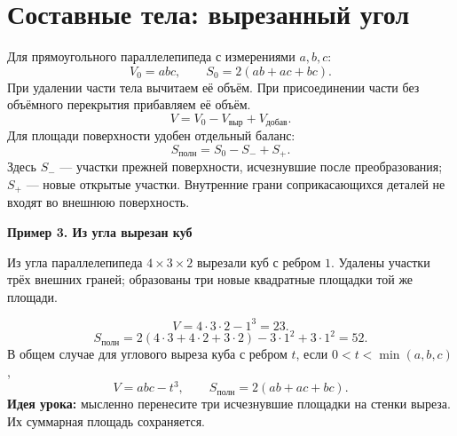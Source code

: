 \documentclass[a4paper,12pt]{article}
\newcommand{\sub}[1]{\par\medskip\textcolor{darkaccent}{\textbf{#1}}\par\smallskip}
\newcommand{\Sp}{S_{\text{полн}}}
\begin{document}
\section{Составные тела: вырезанный угол}
Для прямоугольного параллелепипеда с измерениями $a,b,c$:
\[
V_0=abc,\qquad S_0=2(ab+ac+bc).
\]
При удалении части тела вычитаем её объём. При присоединении части без объёмного перекрытия прибавляем её объём.
\[
V=V_0-V_{\text{выр}}+V_{\text{добав}}.
\]
Для площади поверхности удобен отдельный баланс:
\[
\Sp=S_0-S_{-}+S_{+}.
\]
Здесь $S_-$ --- участки прежней поверхности, исчезнувшие после преобразования; $S_+$ --- новые открытые участки. Внутренние грани соприкасающихся деталей не входят во внешнюю поверхность.
\sub{Пример 3. Из угла вырезан куб}
Из угла параллелепипеда $4\times3\times2$ вырезали куб с ребром $1$. Удалены участки трёх внешних граней; образованы три новые квадратные площадки той же площади.
\begin{center}
\end{center}
\[
V=4\cdot3\cdot2-1^3=23.
\]
\[
\Sp=2(4\cdot3+4\cdot2+3\cdot2)-3\cdot1^2+3\cdot1^2=52.
\]
В общем случае для углового выреза куба с ребром $t$, если $0<t<\min(a,b,c)$,
\[
V=abc-t^3,\qquad \Sp=2(ab+ac+bc).
\]
\textbf{Идея урока:} мысленно перенесите три исчезнувшие площадки на стенки выреза. Их суммарная площадь сохраняется.
\clearpage
\end{document}
